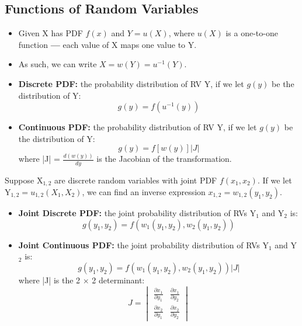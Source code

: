 \documentclass[10pt, letterpaper, twoside]{article}
\begin{document}
\begin{multicols}{2}
\section{Functions of Random Variables}

\begin{itemize}
    \item Given X has PDF $f(x)$ and $Y = u(X)$, where $u(X)$ is a one-to-one function \textbf{---} each value of X maps one value to Y.
    \item As such, we can write $X = w(Y) = u^{-1}(Y)$. 
    \item \textbf{Discrete PDF:} the probability distribution of RV Y, if we let $g(y)$ be the distribution of Y:
    \begin{equation*}
        g(y) = f(u^{-1}(y))
    \end{equation*}
    
    \item \textbf{Continuous PDF:} the probability distribution of RV Y, if we let $g(y)$ be the distribution of Y:
    \begin{equation*}
        g(y) = f[w(y)]|J|
    \end{equation*}
    where |J| = $\frac{d(w(y))}{dy}$ is the Jacobian of the transformation.
\end{itemize}

Suppose X$_{1,2}$ are discrete random variables with joint PDF $f(x_1, x_2)$. If we let Y$_{1,2} = u_{1,2}(X_1, X_2)$, we can find an inverse expression $x_{1,2} = w_{1,2}(y_1, y_2)$.
\begin{itemize}
    \item \textbf{Joint Discrete PDF:} the joint probability distribution of RVs Y$_1$ and Y$_2$ is:
    \begin{equation*}
        g(y_1, y_2) = f(w_1(y_1, y_2), w_2(y_1, y_2))
    \end{equation*}
    \item \textbf{Joint Continuous PDF:} the joint probability distribution of RVs Y$_1$ and Y$_2$ is:
    \begin{equation*}
        g(y_1, y_2) = f(w_1(y_1, y_2), w_2(y_1, y_2))|J|
    \end{equation*}
    where |J| is the 2 $\times$ 2 determinant:
    \begin{equation*}
        J = \begin{vmatrix}
            \frac{\partial x_1}{\partial y_1} & \frac{\partial x_1}{\partial y_2} \\
            \frac{\partial x_2}{\partial y_1} & \frac{\partial x_2}{\partial y_2}
        \end{vmatrix}
    \end{equation*}
\end{itemize}


\end{multicols}
\end{document}
